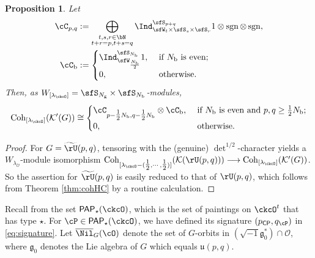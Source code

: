 \documentclass[12pt,a4paper]{amsart}
\def\Im{\operatorname{Im}}
\newcommand{\CK}{{\mathcal {K}}}
\newcommand{\CO}{{\mathcal {O}}}
\newcommand{\CP}{{\mathcal {P}}}
\newcommand{\sgn}{\operatorname{sgn}}
\newcommand{\g}{\mathfrak g}
\renewcommand{\u}{\mathfrak u}
\renewcommand{\t}{\mathfrak t}
\numberwithin{equation}{section}
\newtheorem{prop}[thm]{Proposition}
\theoremstyle{remark}
\def\half{{\tfrac{1}{2}}}
\def\CP{\mathsf{CP}}
\def\lamck{\lambda_\ckcO}
\def\Lamck{[\lambda_\ckcO]}
\def\PP{\mathsf{PAP}}
\def\WLamck{W_{[\lambda_{\ckcO}]}}
\def\tU{\widetilde{\rU}}
\def\Im{\mathrm{Im}}
\def\Coh{\mathrm{Coh}}
\begin{document}

\begin{prop}\label{lem:ccrU}
  Let
\[
  \begin{split}
    \cC_{p,q} &:= \bigoplus_{\substack{t,s,r\in \bN\\t+r=p, t+s = q}}
    \Ind_{\sfW_{t}\times \sfS_s\times \sfS_r}^{\sfS_{p+q}}
 1\otimes \sgn \otimes \sgn ,\\
 \cC_{\mathrm b} &:= \begin{cases}
  \Ind_{\sfW_{\frac{N_{\mathrm b}}{2}}}^{\sfS_{N_{\mathrm b}}} 1, & \ \text{if $N_{\mathrm b}$ is even};\\
  0, & \ \text{otherwise}.
 \end{cases}
  \end{split}
\]
Then, as $\WLamck =\sfS_{N_{\mathrm g}}\times \sfS_{N_{\mathrm b}}$-modules,
\[
  \Coh_{\Lamck}(\CK'(G)) \cong \begin{cases}
    \cC_{p-\half N_{\mathrm b},q-\half N_{\mathrm b}}\otimes \cC_{\mathrm b}, &\  \text{if $N_{\mathrm b}$ is even and
      $p,q \geq \half N_{\mathrm b}$};\\
    0, & \ \text{otherwise}.
  \end{cases}
\]
\end{prop}
\begin{proof}
  For $G=\tU(p,q)$, tensoring with the (genuine) $\det^{1/2}$-character yields a
  $W_{\lambda_{\check \CO}}$-module isomorphism
  $\Coh_{[\lamck-(\half, \cdots, \half)]}(\CK(\rU(p,q))) \longrightarrow \Coh_{\Lamck}(\CK'(G))$.
  So the assertion for $\tU(p,q)$ is easily reduced to that of $\rU(p,q)$, which follows from Theorem \ref{thm:cohHC} by a routine
  calculation.
\end{proof}


Recall from  the set $\PP_{\star}(\ckcO)$, which is the set of paintings on $\ckcO^{t}$ that has type $\star$.
For $\cP \in \PP_{\star}(\ckcO)$, we have defined its signature $(p_\CP, q_\cP)$ in \eqref{eq:signature}. Let $\overline \Nil_{G}(\cO)$ denote the set of $G$-orbits in $(\sqrt{-1}\g_0^*)\cap \CO$, where $\g_0$ denotes the Lie algebra of $G$ which equals $\u(p,q)$.
\end{document}
